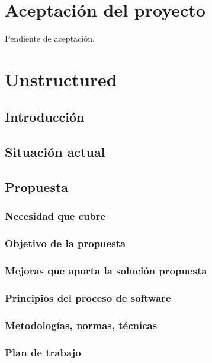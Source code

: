 \section{Aceptación del proyecto}
\par Pendiente de aceptación.




\clearpage
\section{Unstructured}
\subsection{Introducción}
\subsection{Situación actual}
\subsection{Propuesta}
\shit

\subsubsection{Necesidad que cubre}
\shit

\subsubsection{Objetivo de la propuesta}
\shit

\subsubsection{Mejoras que aporta la solución propuesta}

\subsubsection{Principios del proceso de software}
\shit

\subsubsection{Metodologías, normas, técnicas}
\shit

\subsubsection{Plan de trabajo}
\shit

